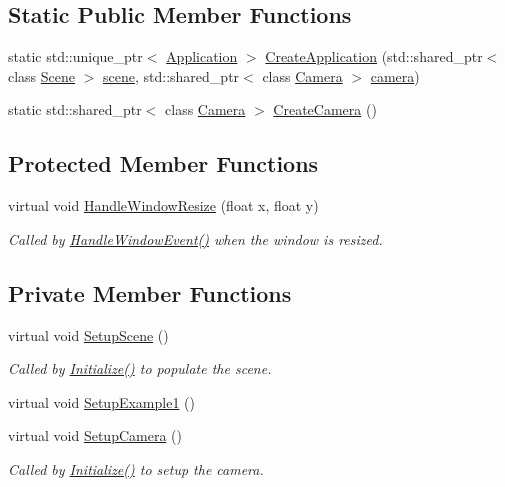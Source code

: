\subsection*{Static Public Member Functions}
\begin{DoxyCompactItemize}
\item 
static std\+::unique\+\_\+ptr$<$ \hyperlink{class_application}{Application} $>$ \hyperlink{class_assignment3_a12b30bd7b8a0bcefbd977f126ce00b25}{Create\+Application} (std\+::shared\+\_\+ptr$<$ class \hyperlink{class_scene}{Scene} $>$ \hyperlink{class_application_a88c6615107a5094bb93fa5f153f79554}{scene}, std\+::shared\+\_\+ptr$<$ class \hyperlink{class_camera}{Camera} $>$ \hyperlink{class_application_a0e8589fcb13c520ba472473abe5a518d}{camera})
\item 
static std\+::shared\+\_\+ptr$<$ class \hyperlink{class_camera}{Camera} $>$ \hyperlink{class_assignment3_a47d1b58079eee3e135e08768cd2a2461}{Create\+Camera} ()
\end{DoxyCompactItemize}
\subsection*{Protected Member Functions}
\begin{DoxyCompactItemize}
\item 
virtual void \hyperlink{class_assignment3_a851c637c83c8092d8adfb5c9f761daeb}{Handle\+Window\+Resize} (float x, float y)
\begin{DoxyCompactList}\small\item\em Called by \hyperlink{class_application_a74d92db64e051efa56d0357989dcb755}{Handle\+Window\+Event()} when the window is resized. \end{DoxyCompactList}\end{DoxyCompactItemize}
\subsection*{Private Member Functions}
\begin{DoxyCompactItemize}
\item 
virtual void \hyperlink{class_assignment3_a2dc29d9016a9d822ede84b9ef41429a5}{Setup\+Scene} ()
\begin{DoxyCompactList}\small\item\em Called by \hyperlink{class_application_a17cf1ea4552d26a1c20f7d98d793d41d}{Initialize()} to populate the scene. \end{DoxyCompactList}\item 
virtual void \hyperlink{class_assignment3_a468c30083d6f75d99cd1fe41205983dc}{Setup\+Example1} ()
\item 
virtual void \hyperlink{class_assignment3_a1d23eb19973b78e516169f4a03954526}{Setup\+Camera} ()
\begin{DoxyCompactList}\small\item\em Called by \hyperlink{class_application_a17cf1ea4552d26a1c20f7d98d793d41d}{Initialize()} to setup the camera. \end{DoxyCompactList}\end{DoxyCompactItemize}
